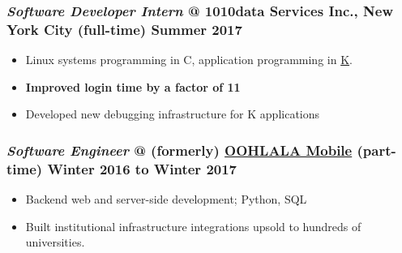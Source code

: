 \documentclass{article}
\newcommand\jobtitle\textit
\providecommand{\tightlist}{%
  \setlength{\itemsep}{0pt}\setlength{\parskip}{0pt}}
\begin{document}

\subsubsection*{%
  \jobtitle{Software Developer Intern} @ 1010data Services Inc., New York City (full-time)
  \hfill Summer 2017
}
\begin{itemize}\tightlist
  \item Linux systems programming in C, application programming in \href{https://en.wikipedia.org/wiki/K_\%28programming_language\%29}{K}.
  \item \textbf{Improved login time by a factor of 11}
  \item Developed new debugging infrastructure for K applications
\end{itemize}

\subsubsection*{
  \jobtitle{Software Engineer} @ (formerly) \href{https://www.readyeducation.com}{OOHLALA Mobile}
  (part-time)
  \hfill Winter 2016 to Winter 2017
}
\begin{itemize}\tightlist
  \item Backend web and server-side development; Python, SQL
  \item Built institutional infrastructure integrations upsold to hundreds of universities.
\end{itemize}
\end{document}
